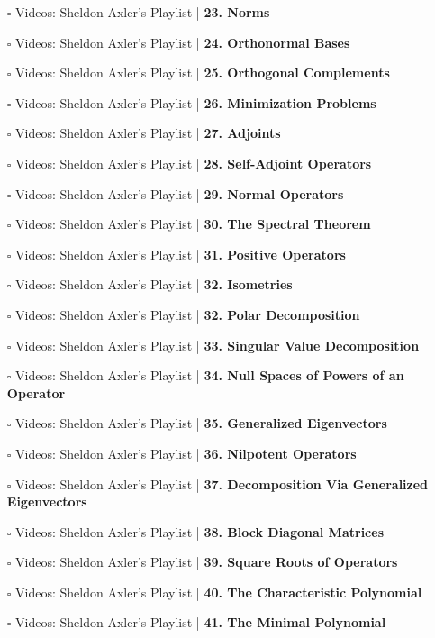 \documentclass[a4, landscape, 12pt]{article}
\newcommand{\checkbox}{$\square$}%
\begin{document}
\begin{itemize}
{}
\item [\checkbox] Videos: Sheldon Axler’s Playlist  | \textbf{23. Norms
}
\item [\checkbox] Videos: Sheldon Axler’s Playlist  | \textbf{24. Orthonormal Bases
}
\item [\checkbox] Videos: Sheldon Axler’s Playlist  | \textbf{25. Orthogonal Complements
}
\item [\checkbox] Videos: Sheldon Axler’s Playlist  | \textbf{26. Minimization Problems
}
\item [\checkbox] Videos: Sheldon Axler’s Playlist  | \textbf{27. Adjoints
}
\item [\checkbox] Videos: Sheldon Axler’s Playlist  | \textbf{28. Self-Adjoint Operators
}
\item [\checkbox] Videos: Sheldon Axler’s Playlist  | \textbf{29. Normal Operators
}
\item [\checkbox] Videos: Sheldon Axler’s Playlist  | \textbf{30. The Spectral Theorem
}
\item [\checkbox] Videos: Sheldon Axler’s Playlist  | \textbf{31. Positive Operators
}
\item [\checkbox] Videos: Sheldon Axler’s Playlist  | \textbf{32. Isometries
}
\item [\checkbox] Videos: Sheldon Axler’s Playlist  | \textbf{32. Polar Decomposition
}
\item [\checkbox] Videos: Sheldon Axler’s Playlist  | \textbf{33. Singular Value Decomposition
}
\item [\checkbox] Videos: Sheldon Axler’s Playlist  | \textbf{34. Null Spaces of Powers of an Operator
}
\item [\checkbox] Videos: Sheldon Axler’s Playlist  | \textbf{35. Generalized Eigenvectors
}
\item [\checkbox] Videos: Sheldon Axler’s Playlist  | \textbf{36. Nilpotent Operators
}
\item [\checkbox] Videos: Sheldon Axler’s Playlist  | \textbf{37. Decomposition Via Generalized Eigenvectors
}
\item [\checkbox] Videos: Sheldon Axler’s Playlist  | \textbf{38. Block Diagonal Matrices
}
\item [\checkbox] Videos: Sheldon Axler’s Playlist  | \textbf{39. Square Roots of Operators
}
\item [\checkbox] Videos: Sheldon Axler’s Playlist  | \textbf{40. The Characteristic Polynomial
}
\item [\checkbox] Videos: Sheldon Axler’s Playlist  | \textbf{41. The Minimal Polynomial
}
\end{itemize}
\end{document}
